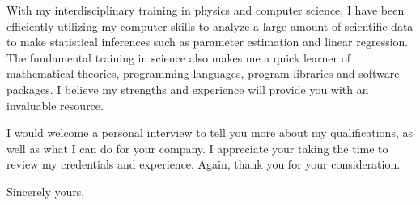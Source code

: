 \documentclass{letter} %
\begin{document}
\begin{letter}{}
With my interdisciplinary training in physics and computer science, I have been efficiently utilizing my computer skills to analyze a large amount of scientific data to make statistical inferences such as parameter estimation and linear regression. The fundamental training in science also makes me a quick learner of mathematical theories, programming languages, program libraries and software packages. I believe my strengths and experience will provide you with an invaluable resource.

\noindent %
I would welcome a personal interview to tell you more about my qualifications, as well as what I can do for your company. I appreciate your taking the time to review my credentials and experience. Again, thank you for your consideration. 
 
\closing{Sincerely yours,} 
 

 

\end{letter}
 
\end{document}
